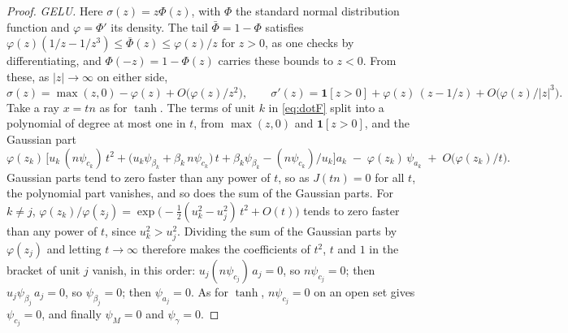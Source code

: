 \documentclass[10pt]{article}
\theoremstyle{definition}
\theoremstyle{remark}
\begin{document}
\begin{proof}
\emph{GELU.} Here $\sigma(z) = z\Phi(z)$, with $\Phi$ the standard normal distribution function and $\varphi = \Phi'$ its density. The tail $\bar\Phi = 1 - \Phi$ satisfies $\varphi(z)(1/z - 1/z^3) \le \bar\Phi(z) \le \varphi(z)/z$ for $z > 0$, as one checks by differentiating, and $\Phi(-z) = 1 - \Phi(z)$ carries these bounds to $z < 0$. From these, as $\lvert z\rvert \to \infty$ on either side,
\[
\sigma(z) = \max(z, 0) - \varphi(z) + O\big(\varphi(z)/z^2\big),\qquad
\sigma'(z) = \mathbf 1[z > 0] + \varphi(z)\,(z - 1/z) + O\big(\varphi(z)/\lvert z\rvert^3\big).
\]
Take a ray $x = tn$ as for $\tanh$. The terms of unit $k$ in \cref{eq:dotF} split into a polynomial of degree at most one in $t$, from $\max(z, 0)$ and $\mathbf 1[z > 0]$, and the Gaussian part
\[
\varphi(z_k)\,\Big[u_k\,(n\psi_{c_k})\,t^2 + \big(u_k\psi_{\beta_k} + \beta_k\,n\psi_{c_k}\big)\,t + \beta_k\psi_{\beta_k} - (n\psi_{c_k})/u_k\Big]a_k \;-\; \varphi(z_k)\,\psi_{a_k} \;+\; O\big(\varphi(z_k)/t\big).
\]
Gaussian parts tend to zero faster than any power of $t$, so as $J(tn) = 0$ for all $t$, the polynomial part vanishes, and so does the sum of the Gaussian parts. For $k \neq j$, $\varphi(z_k)/\varphi(z_j) = \exp\big(-\tfrac12(u_k^2 - u_j^2)\,t^2 + O(t)\big)$ tends to zero faster than any power of $t$, since $u_k^2 > u_j^2$. Dividing the sum of the Gaussian parts by $\varphi(z_j)$ and letting $t \to \infty$ therefore makes the coefficients of $t^2$, $t$ and $1$ in the bracket of unit $j$ vanish, in this order: $u_j(n\psi_{c_j})\,a_j = 0$, so $n\psi_{c_j} = 0$; then $u_j\psi_{\beta_j}\,a_j = 0$, so $\psi_{\beta_j} = 0$; then $\psi_{a_j} = 0$. As for $\tanh$, $n\psi_{c_j} = 0$ on an open set gives $\psi_{c_j} = 0$, and finally $\psi_M = 0$ and $\psi_\gamma = 0$.
\end{proof}
\end{document}
